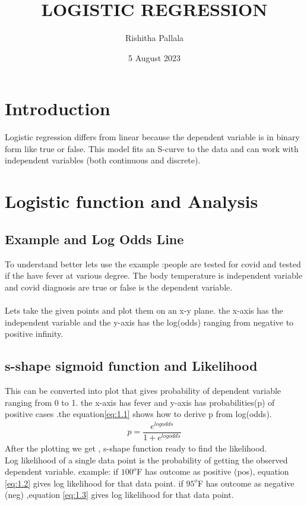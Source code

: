\documentclass{article}
\title{LOGISTIC REGRESSION}
\author{Rishitha Pallala }
\date{5 August 2023}
\begin{document}
\maketitle

\section{Introduction}
     Logistic regression differs from linear because the dependent variable is in binary form like true or false. This model fits an S-curve to the data and can work with independent variables (both continuous and discrete). 
     \section{Logistic function and Analysis}
     \subsection{Example and Log Odds Line}
     To understand better lets use the example  :people are tested for covid and tested if the have fever at various degree. The body temperature is independent variable and covid diagnosis are true or false is the dependent variable.\\\\ 
     Lets take the given points and plot them on an x-y plane. the x-axis has the independent variable and the y-axis has the log(odds) ranging from negative to positive infinity.
     
     \subsection{s-shape sigmoid function and Likelihood}
     This can be converted into plot that gives probability of dependent variable ranging from 0 to 1. the x-axis has fever and y-axis has probabilities(p) of positive cases .the equation\eqref{eq:1.1} shows how to derive p from log(odds).
     \begin{align}
        p=\dfrac{e^{logodds}}{1+e^{logodds}} \label{eq:1.1}
     \end{align}
     After the plotting we get , s-shape function ready to find the likelihood. \\
     Log likelihood of a single data point is the probability of getting the observed dependent variable.
     example: if $100^o$F has outcome as positive (pos),  equation \eqref{eq:1.2} gives log likelihood for that data point.
     if $95^o$F has outcome as negative (neg) ,equation \eqref{eq:1.3} gives log likelihood for that data point.
     
\end{document}
